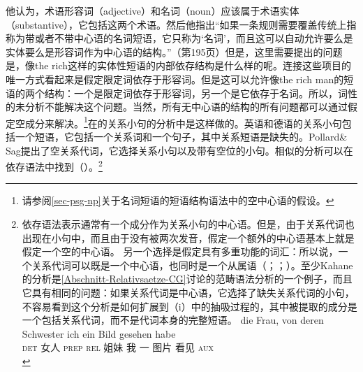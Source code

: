 他认为，术语形容词（adjective）和名词（noun）应该属于术语实体（substantive），它包括这两个术语。然后他指出“如果一条规则需要覆盖传统上指称为带或者不带中心语的名词短语，它只称为‘名词’，而且这可以自动允许要么是实体要么是形容词作为中心语的结构。”（第195页）但是，这里需要提出的问题是，像the rich这样的实体性短语的内部依存结构是什么样的呢。连接这些项目的唯一方式看起来是假定限定词依存于形容词。但是这可以允许像the rich man的短语的两个结构：一个是限定词依存于形容词，另一个是它依存于名词。所以，词性的未分析不能解决这个问题。当然，所有无中心语的结构的所有问题都可以通过假定空成分来解决。\footnote{请参阅\ref{sec-psg-np}关于名词短语的短语结构语法中的空中心语的假设。}在\hpsgc 的关系小句的分析中是这样做的\citep[\S~5]{ps2}。英语和德语的关系小句包括一个短语，它包括一个关系词和一个句子，其中关系短语是缺失的。Pollard\& Sag提出了空关系代词，它选择关系小句以及带有空位的小句\citep[--217]{ps2}。相似的分析可以在依存语法中找到（\citealp[]{Eroms2000a}）。\footnote{%
依存语法表示通常有一个成分作为关系小句的中心语。但是，由于关系代词也出现在小句中，而且由于没有被两次发音，假定一个额外的中心语基本上就是假定一个空的中心语。
%
另一个选择是假定具有多重功能的词汇：所以说，一个关系代词可以既是一个中心语，也同时是一个从属语（\citealp[\S 246, §8--11]{Tesniere2015a-not-crossreferenced}；\citealp[\page xlvi]{OK2015a}；\citealp[--130]{Kahane2009a}）。至少Kahane的分析是\ref{Abschnitt-Relativsaetze-CG}讨论的范畴语法分析的一个例子，而且它具有相同的问题：如果关系代词是中心语，它选择了缺失关系代词的小句，不容易看到这个分析是如何扩展到（i）中的抽吸过程的，其中被提取的成分是一个包括关系代词，而不是代词本身的完整短语。
\ea
\gll die Frau, von deren Schwester ich ein Bild gesehen habe\\
     \textsc{det} 女人 \textsc{prep} \textsc{rel} 姐妹 我 一 图片 看见 \textsc{aux}\\
\zlast
}
